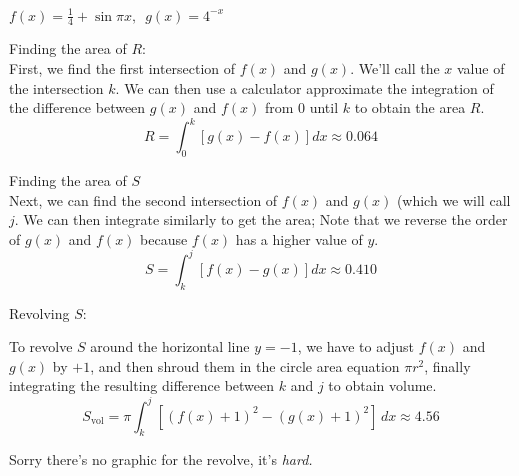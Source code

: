 \begin{center}
\end{center}

\begin{center}
		\noindent
		$f(x) = \frac{1}{4} + \sin{\pi x}, \enspace g(x) = 4^{-x}$ \\
\end{center}

\noindent
Finding the area of $R$: \\

First, we find the first intersection of $f(x)$ and $g(x)$. We'll call the $x$ value of the intersection $k$. We can then use a calculator approximate the integration of the difference between $g(x)$ and $f(x)$ from $0$ until $k$ to obtain the area $R$.
\[ R = \int_{0}^{k} [g(x) - f(x)]dx \approx 0.064 \]

\noindent
Finding the area of $S$ \\

Next, we can find the second intersection of $f(x)$ and $g(x)$ (which we will call $j$. We can then integrate similarly to get the area; Note that we reverse the order of $g(x)$ and $f(x)$ because $f(x)$ has a higher value of $y$.
\[	S = \int_{k}^{j} [f(x) - g(x)]dx \approx 0.410 \]

\noindent
Revolving $S$:

To revolve $S$ around the horizontal line $y = -1$, we have to adjust $f(x)$ and $g(x)$ by $+1$, and then shroud them in the circle area equation $\pi r^2$, finally integrating the resulting difference between $k$ and $j$ to obtain volume.
\[ S_{\text{vol}} = \pi\!\int_{k}^{j} [(f(x)+1)^2 - (g(x)+1)^2]\,dx \approx 4.56 \]

Sorry there's no graphic for the revolve, it's \textit{hard.}
